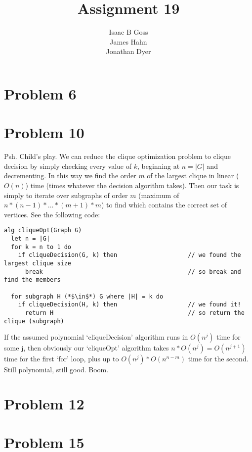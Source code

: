 \documentclass{article}
\author{Isaac B Goss\\ James Hahn\\ Jonathan Dyer}
\title{Assignment 19}
\providecommand{\prob}[1]{\section*{Problem #1}}
\begin{document}
\maketitle
\prob{6}




\prob{10}
Psh. Child's play.
We can reduce the clique optimization problem to clique decision by simply checking every value of $k$, 
beginning at $n = |G|$ and decrementing. 
In this way we find the order $m$ of the largest clique in linear ($O(n)$) time (times whatever the decision algorithm takes). 
Then our task is simply to iterate over subgraphs of order $m$ (maximum of $n*(n-1)*\dots*(m+1)*m$)
to find which contains the correct set of vertices. See the following code:
\begin{lstlisting}
alg cliqueOpt(Graph G)
  let n = |G|
  for k = n to 1 do
    if cliqueDecision(G, k) then                    // we found the largest clique size
      break                                         // so break and find the members

  for subgraph H (*$\in$*) G where |H| = k do
    if cliqueDecision(H, k) then                    // we found it!
      return H                                      // so return the clique (subgraph)
\end{lstlisting}
If the assumed polynomial `cliqueDecision' algorithm runs in $O(n^j)$ time for some j, 
then obviously our `cliqueOpt' algorithm takes $n*O(n^j) = O(n^{j+1})$ time for the first `for' loop, 
plus up to $O(n^j) * O(n^{n-m})$ time for the second. 
Still polynomial, still good. Boom.

\prob{12}



\prob{15}
\end{document}
